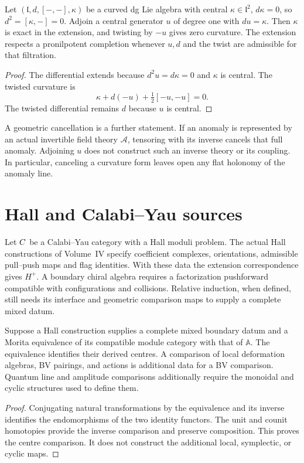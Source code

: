 \begin{proposition}
Let $(\mathfrak l,d,[-,-],\kappa)$ be a curved dg Lie algebra with central
$\kappa\in\mathfrak l^2$, $d\kappa=0$, so $d^2=[\kappa,-]=0$.
Adjoin a central generator $u$ of degree one with $du=\kappa$.
Then $\kappa$ is exact in the extension, and twisting by $-u$ gives zero
curvature. The extension respects a pronilpotent completion whenever
$u,d$ and the twist are admissible for that filtration.
\end{proposition}
\begin{proof}
The differential extends because $d^2u=d\kappa=0$ and $\kappa$ is central.
The twisted curvature is
\[
 \kappa+d(-u)+\tfrac12[-u,-u]=0.
\]
The twisted differential remains $d$ because $u$ is central.
\end{proof}

A geometric cancellation is a further statement. If an anomaly is
represented by an actual invertible field theory $\mathcal A$, tensoring
with its inverse cancels that full anomaly. Adjoining $u$ does not
construct such an inverse theory or its coupling. In particular, canceling
a curvature form leaves open any flat holonomy of the anomaly line.

\section{Hall and Calabi--Yau sources}
Let $C$ be a Calabi--Yau category with a Hall moduli problem.
The actual Hall constructions of Volume~IV specify coefficient complexes,
orientations, admissible pull--push maps and flag identities. With these
data the extension correspondence gives $H^+$. A boundary chiral algebra
requires a factorization pushforward compatible with configurations and
collisions. Relative induction, when defined, still needs its interface
and geometric comparison maps to supply a complete mixed datum.

\begin{proposition}
Suppose a Hall construction supplies a complete mixed boundary datum and a Morita equivalence of its compatible module category with that of $\mathbb A$. The equivalence identifies their derived centres. A comparison of local deformation algebras, BV pairings, and actions is additional data for a BV comparison. Quantum line and amplitude comparisons additionally require the monoidal and cyclic structures used to define them.
\end{proposition}
\begin{proof}
Conjugating natural transformations by the equivalence and its inverse identifies the endomorphisms of the two identity functors. The unit and counit homotopies provide the inverse comparison and preserve composition. This proves the centre comparison. It does not construct the additional local, symplectic, or cyclic maps.
\end{proof}

